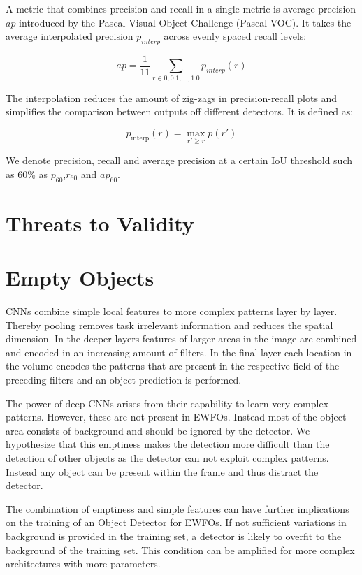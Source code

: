 A metric that combines precision and recall in a single metric is average precision $ap$ introduced by the Pascal Visual Object Challenge (Pascal VOC)\cite{Everingham2010}. It takes the average interpolated precision $p_{interp}$ across evenly spaced recall levels:

$$ ap = \frac{1}{11}\sum_{r \in {0,0.1,...,1.0}}p_{interp}(r)$$

The interpolation reduces the amount of zig-zags in precision-recall plots and simplifies the comparison between outputs off different detectors. It is defined as:

$$ p_\text{interp}(r) = \max\limits_{r' \geq r} p(r')$$

We denote precision, recall and average precision at a certain \ac{IoU} threshold such as 60\% as $p_{60}$,$r_{60}$ and $ap_{60}$.

\section{Threats to Validity}

\section{Empty Objects}
\label{sec:empty}
\acp{CNN} combine simple local features to more complex patterns layer by layer. Thereby pooling removes task irrelevant information and reduces the spatial dimension. In the deeper layers features of larger areas in the image are combined and encoded in an increasing amount of filters. In the final layer each location in the volume encodes the patterns that are present in the respective field of the preceding filters and an object prediction is performed.

The power of deep \acp{CNN} arises from their capability to learn very complex patterns. However, these are not present in \acp{EWFO}. Instead most of the object area consists of background and should be ignored by the detector. We hypothesize that this emptiness makes the detection more difficult than the detection of other objects as the detector can not exploit complex patterns. Instead any object can be present within the frame and thus distract the detector.

The combination of emptiness and simple features can have further implications on the training of an Object Detector for \acp{EWFO}. If not sufficient variations in background is provided in the training set, a detector is likely to overfit to the background of the training set. This condition can be amplified for more complex architectures with more parameters.

